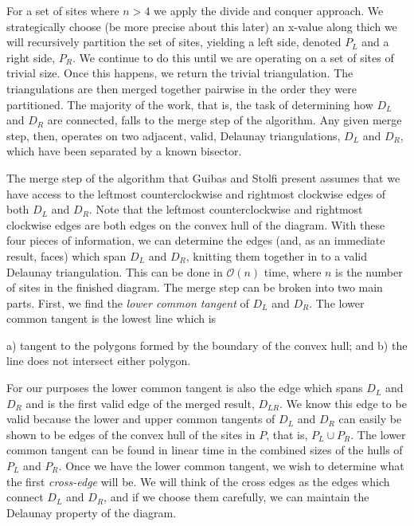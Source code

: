 \documentclass[12pt,twoside]{reedthesis}
\begin{document}
  For a set of sites where $n>4$ we apply the divide and conquer approach. We strategically choose (be more precise about this later) an x-value along thich we will recursively partition the set of sites, yielding a left side, denoted $P_{L}$ and a right side, $P_{R}$. We continue to do this until we are operating on a set of sites of trivial size. Once this happens, we return the trivial triangulation. The triangulations are then merged together pairwise in the order they were partitioned. The majority of the work, that is, the task of determining how $D_{L}$ and $D_{R}$ are connected, falls to the merge step of the algorithm. Any given merge step, then, operates on two adjacent, valid, Delaunay triangulations, $D_{L}$ and $D_{R}$, which have been separated by a known bisector.\par

  The merge step of the algorithm that Guibas and Stolfi present assumes that we have access to the leftmost counterclockwise and rightmost clockwise edges of both $D_{L}$ and $D_{R}$. Note that the leftmost counterclockwise and rightmost clockwise edges are both edges on the convex hull of the diagram. With these four pieces of information, we can determine the edges (and, as an immediate result, faces) which span $D_{L}$ and $D_{R}$, knitting them together in to a valid Delaunay triangulation. This can be done in $\mathcal{O}(n)$ time, where $n$ is the number of sites in the finished diagram. The merge step can be broken into two main parts. First, we find the \emph{lower common tangent} of $D_{L}$ and $D_{R}$. The lower common tangent is the lowest line which is\begin{inparaenum} a) tangent to the polygons formed by the boundary of the convex hull; and b) the line does not intersect either polygon.\end{inparaenum} For our purposes the lower common tangent is also the edge which spans $D_{L}$ and $D_{R}$ and is the first valid edge of the merged result, $D_{LR}$. We know this edge to be valid because the lower and upper common tangents of $D_{L}$ and $D_{R}$ can easily be shown to be edges of the convex hull of the sites in $P$, that is, $P_{L} \cup P_{R}$. The lower common tangent can be found in linear time in the combined sizes of the hulls of $P_{L}$ and $P_{R}$. Once we have the lower common tangent, we wish to determine what the first \emph{cross-edge} will be. We will think of the cross edges as the edges which connect $D_{L}$ and $D_{R}$, and if we choose them carefully, we can maintain the Delaunay property of the diagram.\par
\end{document}
